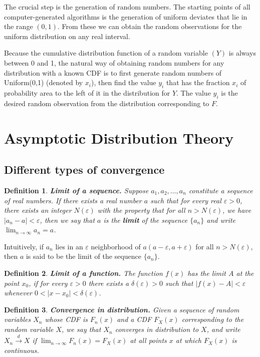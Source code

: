 \documentclass{article}
\newtheorem{definition}{Definition}[section]
\begin{document}
The crucial step is the generation of random numbers. The starting points of all computer-generated algorithms is the generation of uniform deviates that lie in the range $(0,1)$. From these we can obtain the random observations for the uniform distribution on any real interval.

Because the cumulative distribution function of a random variable $(Y)$ is always between 0 and 1, the natural way of obtaining random numbers for any distribution with a known CDF is to first generate random numbers of Uniform(0,1) (denoted by \(x_i\)), then find the value \(y_i\) that has the fraction \(x_i\) of probability area to the left of it in the distribution for \(Y\). The value \(y_i\) is the desired random observation from the distribution corresponding to \(F\).

\section{Asymptotic Distribution Theory}

\subsection{Different types of convergence}

\begin{definition} \textbf{Limit of a sequence.}
    Suppose \(a_1,a_2,\dots,a_n\) constitute a sequence of real numbers. If there exists a real number $a$ such that for every real \(\varepsilon>0\), there exists an integer \(N(\varepsilon)\) with the property that for all \(n>N(\varepsilon)\), we have \(|a_n-a|<\varepsilon\), then we say that $a$ is the \textbf{limit} of the sequence \(\{a_n\}\) and write \(\lim_{n \rightarrow \infty}a_n=a\).
\end{definition}

Intuitively, if \(a_n\) lies in an \(\varepsilon\) neighborhood of \(a (a-\varepsilon,a+\varepsilon)\) for all \(n>N(\varepsilon)\), then \(a\) is said to be the limit of the sequence \(\{a_n\}\).

\begin{definition} \textbf{Limit of a function.} The function $f(x)$ has the limit $A$ at the point $x_0$, if for every \(\varepsilon>0\) there exists a \(\delta(\varepsilon)>0\) such that \(|f(x)-A|<\varepsilon\) whenever \(0<|x-x_0|<\delta(\varepsilon)\).
\end{definition}

\begin{definition} \textbf{Convergence in distribution.} Given a sequence of random variables \(X_n\) whose CDF is \(F_n(x)\) and a CDF \(F_X(x)\) corresponding to the random variable \(X\), we say that \(X_n\) converges in distribution to \(X\), and write \(X_n \stackrel{d}{\longrightarrow} X\) if \(\lim_{n \rightarrow \infty}F_n(x)=F_X(x)\) at all points $x$ at which $F_X(x)$ is continuous.     
\end{definition}
\end{document}
